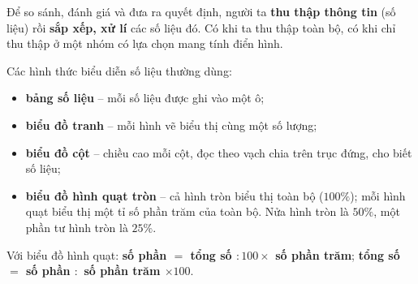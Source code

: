 \documentclass[11pt]{article}
\begin{document}
\newcommand{\stpBars}[6]{%
\begin{tikzpicture}[font=\footnotesize,y=#1cm,x=1cm,>=stealth]
\foreach \n/\v/\d [count=\i] in {#4}{\xdef\stpN{\i}}
\pgfmathsetmacro\stpW{\stpN*1.2+0.1}
\foreach \t in {0,#3,...,#2}{\draw[Line] (0,\t)--(\stpW,\t); \node[left,text=Slate] at (0,\t){$\t$};}
\foreach \n/\v/\d [count=\i] in {#4}{
  \pgfmathsetmacro\stpC{\i*1.2-0.5}
  \fill[tmBlue!65] (\stpC-0.3,0) rectangle (\stpC+0.3,\v);
  \node[above,font=\footnotesize\bfseries,text=Ink] at (\stpC,\v){$\d$};
  \node[below,text=Ink] at (\stpC,0){\n};}
\draw[->,line width=0.8pt] (0,0)--([yshift=0.55cm]0,#2);
\draw[->,line width=0.8pt] (0,0)--(\stpW+0.35,0);
\node[above,text=Slate] at ([yshift=0.55cm]0,#2){#5};
\node[right,text=Slate] at (\stpW+0.35,0){#6};
\end{tikzpicture}}
\newcommand{\stpPie}[2][1.5]{%
\begin{tikzpicture}[font=\footnotesize]
\def\stpA{90}
\foreach \v/\t/\c/\n [count=\i] in {#2}{
  \pgfmathsetmacro\stpB{\stpA-3.6*\v}
  \pgfmathsetmacro\stpM{(\stpA+\stpB)/2}
  \pgfmathsetmacro\stpR{0.64*#1}
  \fill[\c] (0,0) -- (\stpA:#1) arc[start angle=\stpA,end angle=\stpB,radius=#1] -- cycle;
  \draw[white,line width=1.2pt] (0,0) -- (\stpA:#1);
  \node[text=Ink,font=\footnotesize\bfseries] at (\stpM:\stpR) {\t};
  \fill[\c] (#1+0.7,#1-0.55*\i+0.1) rectangle ++(0.32,0.32);
  \node[anchor=west,text=Ink,font=\small] at (#1+1.1,#1-0.55*\i+0.26) {\n};
  \global\let\stpA\stpB}
\draw[Slate,line width=0.8pt] (0,0) circle (#1);
\end{tikzpicture}}
\newcommand{\stpIcons}[1]{\foreach \k in {1,...,#1}{\textcolor{tmBlue}{\faBook}\ }}
\begin{knowbox}
Để so sánh, đánh giá và đưa ra quyết định, người ta \textbf{thu thập thông tin} (số liệu) rồi \textbf{sắp xếp, xử lí} các số liệu đó. Có khi ta thu thập toàn bộ, có khi chỉ thu thập ở một nhóm có lựa chọn mang tính điển hình.\par\smallskip
Các hình thức biểu diễn số liệu thường dùng:
\begin{itemize}[leftmargin=1.4em,itemsep=3pt]
\item \textbf{bảng số liệu} -- mỗi số liệu được ghi vào một ô;
\item \textbf{biểu đồ tranh} -- mỗi hình vẽ biểu thị cùng một số lượng;
\item \textbf{biểu đồ cột} -- chiều cao mỗi cột, đọc theo vạch chia trên trục đứng, cho biết số liệu;
\item \textbf{biểu đồ hình quạt tròn} -- cả hình tròn biểu thị toàn bộ ($100\%$); mỗi hình quạt biểu thị một tỉ số phần trăm của toàn bộ. Nửa hình tròn là $50\%$, một phần tư hình tròn là $25\%$.
\end{itemize}
Với biểu đồ hình quạt: \quad \textbf{số phần $=$ tổng số $:100\times$ số phần trăm}; \quad \textbf{tổng số $=$ số phần $:$ số phần trăm $\times100$}.
\end{knowbox}
\end{document}
